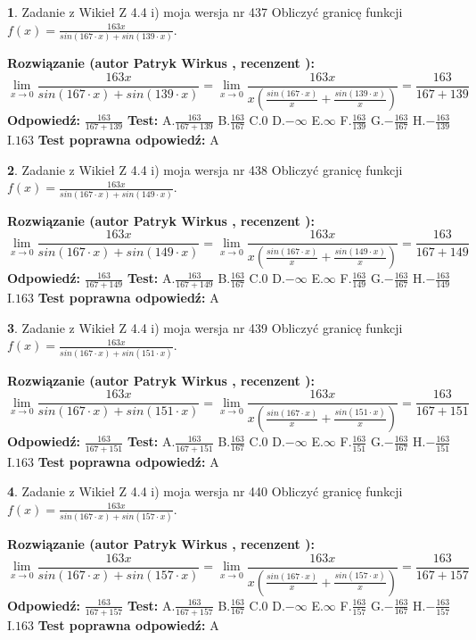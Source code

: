 \documentclass[12pt, a4paper]{article}
\theoremstyle{definition} %
\newtheorem{zad}{}
\newcommand{\zadStart}[1]{\begin{zad}#1\newline}
\newcommand{\zadStop}{\end{zad}}
\newcommand{\rozwStart}[2]{\noindent \textbf{Rozwiązanie (autor #1 , recenzent #2): }\newline}
\newcommand{\rozwStop}{\newline}
\newcommand{\odpStart}{\noindent \textbf{Odpowiedź:}\newline}
\newcommand{\odpStop}{\newline}
\newcommand{\testStart}{\noindent \textbf{Test:}\newline}
\newcommand{\testStop}{\newline}
\newcommand{\kluczStart}{\noindent \textbf{Test poprawna odpowiedź:}\newline}
\newcommand{\kluczStop}{\newline}
\begin{document}
\zadStart{Zadanie z Wikieł Z 4.4 i) moja wersja nr 437}
Obliczyć granicę funkcji $f(x)=\frac{163x}{sin(167\cdot x) +sin(139\cdot x)}$.
\zadStop
\rozwStart{Patryk Wirkus}{}
$$\lim\limits_{x\to 0}\frac{163x}{sin(167\cdot x) +sin(139\cdot x)}=\lim\limits_{x\to 0}\frac{163x}{x(\frac{sin(167\cdot x)}{x}+\frac{sin(139\cdot x)}{x})}=\frac{163}{167+139}$$
\rozwStop
\odpStart
$\frac{163}{167+139}$
\odpStop
\testStart
A.$\frac{163}{167+139}$
B.$\frac{163}{167}$
C.$0$
D.$-\infty$
E.$\infty$
F.$\frac{163}{139}$
G.$-\frac{163}{167}$
H.$-\frac{163}{139}$
I.$163$
\testStop
\kluczStart
A
\kluczStop



\zadStart{Zadanie z Wikieł Z 4.4 i) moja wersja nr 438}
Obliczyć granicę funkcji $f(x)=\frac{163x}{sin(167\cdot x) +sin(149\cdot x)}$.
\zadStop
\rozwStart{Patryk Wirkus}{}
$$\lim\limits_{x\to 0}\frac{163x}{sin(167\cdot x) +sin(149\cdot x)}=\lim\limits_{x\to 0}\frac{163x}{x(\frac{sin(167\cdot x)}{x}+\frac{sin(149\cdot x)}{x})}=\frac{163}{167+149}$$
\rozwStop
\odpStart
$\frac{163}{167+149}$
\odpStop
\testStart
A.$\frac{163}{167+149}$
B.$\frac{163}{167}$
C.$0$
D.$-\infty$
E.$\infty$
F.$\frac{163}{149}$
G.$-\frac{163}{167}$
H.$-\frac{163}{149}$
I.$163$
\testStop
\kluczStart
A
\kluczStop



\zadStart{Zadanie z Wikieł Z 4.4 i) moja wersja nr 439}
Obliczyć granicę funkcji $f(x)=\frac{163x}{sin(167\cdot x) +sin(151\cdot x)}$.
\zadStop
\rozwStart{Patryk Wirkus}{}
$$\lim\limits_{x\to 0}\frac{163x}{sin(167\cdot x) +sin(151\cdot x)}=\lim\limits_{x\to 0}\frac{163x}{x(\frac{sin(167\cdot x)}{x}+\frac{sin(151\cdot x)}{x})}=\frac{163}{167+151}$$
\rozwStop
\odpStart
$\frac{163}{167+151}$
\odpStop
\testStart
A.$\frac{163}{167+151}$
B.$\frac{163}{167}$
C.$0$
D.$-\infty$
E.$\infty$
F.$\frac{163}{151}$
G.$-\frac{163}{167}$
H.$-\frac{163}{151}$
I.$163$
\testStop
\kluczStart
A
\kluczStop



\zadStart{Zadanie z Wikieł Z 4.4 i) moja wersja nr 440}
Obliczyć granicę funkcji $f(x)=\frac{163x}{sin(167\cdot x) +sin(157\cdot x)}$.
\zadStop
\rozwStart{Patryk Wirkus}{}
$$\lim\limits_{x\to 0}\frac{163x}{sin(167\cdot x) +sin(157\cdot x)}=\lim\limits_{x\to 0}\frac{163x}{x(\frac{sin(167\cdot x)}{x}+\frac{sin(157\cdot x)}{x})}=\frac{163}{167+157}$$
\rozwStop
\odpStart
$\frac{163}{167+157}$
\odpStop
\testStart
A.$\frac{163}{167+157}$
B.$\frac{163}{167}$
C.$0$
D.$-\infty$
E.$\infty$
F.$\frac{163}{157}$
G.$-\frac{163}{167}$
H.$-\frac{163}{157}$
I.$163$
\testStop
\kluczStart
A
\kluczStop
\end{document}

